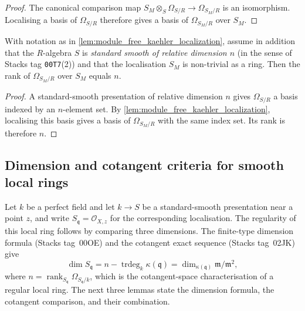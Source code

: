 \begin{proof}
  The canonical comparison map
  \(S_M \otimes_S \Omega_{S/R} \to \Omega_{S_M/R}\) is an isomorphism.
  Localising a basis of \(\Omega_{S/R}\) therefore gives a basis of
  \(\Omega_{S_M/R}\) over \(S_M\).
\end{proof}

\begin{lemma}\leanok
  \label{lem:rank_kaehler_localization_eq_relative_dim}
  With notation as in \cref{lem:module_free_kaehler_localization},
  assume in addition that the \(R\)-algebra \(S\) is \emph{standard
  smooth of relative dimension \(n\)} (in the sense of Stacks tag
  \texttt{00T7}(2)) and that
  the localisation \(S_M\) is non-trivial as a ring. Then the rank of
  \(\Omega_{S_M / R}\) over \(S_M\) equals \(n\).
\end{lemma}

\begin{proof}
  A standard-smooth presentation of relative dimension \(n\) gives
  \(\Omega_{S/R}\) a basis indexed by an \(n\)-element set.  By
  \cref{lem:module_free_kaehler_localization}, localising this basis gives
  a basis of \(\Omega_{S_M/R}\) with the same index set.  Its rank is
  therefore \(n\).
\end{proof}

\subsection{Dimension and cotangent criteria for smooth local rings}
\label{subsec:stage6_subgap_decomposition}

Let \(k\) be a perfect field and let \(k \to S\) be a standard-smooth
presentation near a point \(z\),
and write \(S_{\mathfrak q}=\mathcal O_{X,z}\) for the corresponding
localisation.  The regularity of this local ring follows by comparing
three dimensions.  The finite-type dimension formula (Stacks tag~00OE)
and the cotangent exact sequence (Stacks tag~02JK) give
\[
  \dim S_{\mathfrak q}
  = n-\operatorname{trdeg}_k\kappa(\mathfrak q)
  = \dim_{\kappa(\mathfrak q)} \mathfrak m / \mathfrak m^2,
\]
where \(n=\operatorname{rank}_{S_{\mathfrak q}}
\Omega_{S_{\mathfrak q}/k}\),
which is the cotangent-space characterisation of a regular local ring.
The next three lemmas state the dimension formula, the cotangent
comparison, and their combination.

